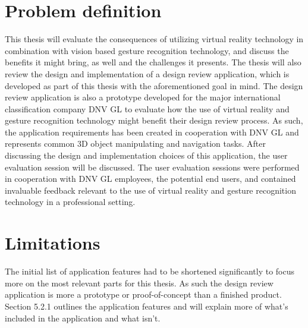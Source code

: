\section{Problem definition}
This thesis will evaluate the consequences of utilizing virtual reality technology in combination with vision based gesture recognition technology, and discuss the benefits it 
might bring, as well and the challenges it presents. 
The thesis will also review the design and implementation of a design review application, which is developed as part of this thesis with the aforementioned goal in mind. 
The design review application is also a prototype developed for the major international classification company DNV GL to evaluate how the use of virtual reality and gesture
recognition technology might benefit their design review process. As such, the application requirements has been created in cooperation with DNV GL and represents
common 3D object manipulating and navigation tasks. After discussing the design and implementation choices of this application, the user evaluation session will be discussed. 
The user evaluation sessions were performed in cooperation with DNV GL employees, the potential end users, and contained invaluable feedback relevant to the use of virtual reality and gesture
recognition technology in a professional setting. 


\section{Limitations}
The initial list of application features had to be shortened significantly to focus more on the most relevant parts for this thesis. As such the design review application
is more a prototype or proof-of-concept than a finished product. Section 5.2.1 outlines the application features and will explain more of what's included in the application and what isn't. 

